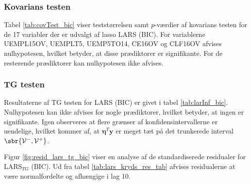 \subsubsection{Kovarians testen}
Tabel \ref{tab:covTest_bic} viser teststørrelsen samt $p$-værdier af kovarians testen for de 17 variabler der er udvalgt af lasso LARS (BIC). 
For variablerne  \textcolor{blue3}{UEMPL15OV}, \textcolor{blue3}{UEMPLT5}, \textcolor{blue3}{UEMP5TO14}, \textcolor{blue3}{CE16OV} og \textcolor{blue3}{CLF16OV} afvises nulhypotesen, hvilket betyder, at disse prædiktorer er signifikante. 
For de resterende prædiktorer kan nulhypotesen ikke afvises. 



\subsubsection{TG testen}
Resultaterne af TG testen for LARS (BIC) er givet i tabel \ref{tab:larInf_bic}.
Nulhypotesen kan ikke afvises for nogle prædiktorer, hvilket betyder, at ingen er signifikante.
Igen observeres at flere grænser af konfidensintervallerne er uendelige, hvilket kommer af, at $\boldsymbol{\eta}^T \textbf{y}$ er meget tæt på det trunkerede interval \(\sbr{\mathcal{V}^-, \mathcal{V}^+}\).



Figur \ref{fig:resid_lars_tg_bic} viser en analyse af de standardiserede residualer for LARS$_{TG}$ (BIC). 
Ud fra tabel \ref{tab:lars_kryds_res_tab} afvises residualerne at være normalfordelte og afhængige i lag 10.






